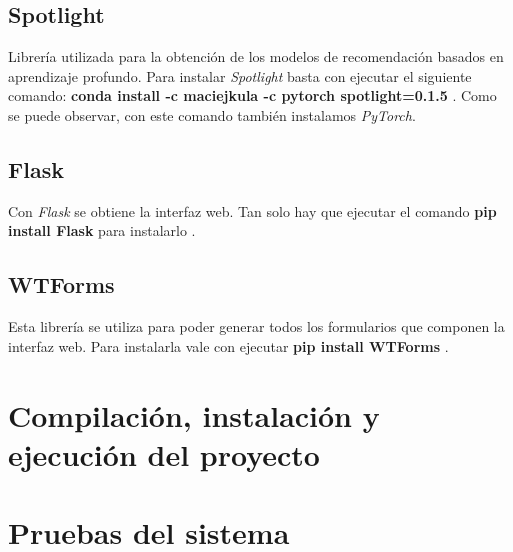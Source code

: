 \subsection{Spotlight}
Librería utilizada para la obtención de los modelos de recomendación basados en aprendizaje profundo. Para instalar \textit{Spotlight} basta con ejecutar el siguiente comando: \textbf{conda install -c maciejkula -c pytorch spotlight=0.1.5} \cite{instalacion-spotlight}. Como se puede observar, con este comando también instalamos \textit{PyTorch}.

\subsection{Flask}
Con \textit{Flask} se obtiene la interfaz web. Tan solo hay que ejecutar el comando \textbf{pip install Flask} para instalarlo \cite{instalacion-flask}.

\subsection{WTForms}
Esta librería se utiliza para poder generar todos los formularios que componen la interfaz web. Para instalarla vale con ejecutar \textbf{pip install WTForms} \cite{instalacion-flask}.

\section{Compilación, instalación y ejecución del proyecto}

\section{Pruebas del sistema}
